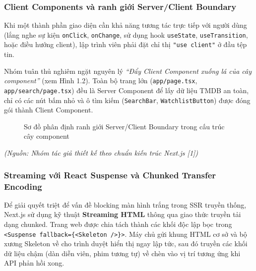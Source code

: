 \documentclass[13pt,a4paper]{extarticle}
\begin{document}
\subsubsection{Client Components và ranh giới Server/Client Boundary}
Khi một thành phần giao diện cần khả năng tương tác trực tiếp với người dùng (lắng nghe sự kiện \texttt{onClick}, \texttt{onChange}, sử dụng hook \texttt{useState}, \texttt{useTransition}, hoặc điều hướng client), lập trình viên phải đặt chỉ thị \texttt{"use client"} ở đầu tệp tin.

Nhóm tuân thủ nghiêm ngặt nguyên lý \textit{``Đẩy Client Component xuống lá của cây component''} (xem Hình 1.2). Toàn bộ trang lớn (\texttt{app/page.tsx}, \texttt{app/search/page.tsx}) đều là Server Component để lấy dữ liệu TMDB an toàn, chỉ có các nút bấm nhỏ và ô tìm kiếm (\texttt{SearchBar}, \texttt{WatchlistButton}) được đóng gói thành Client Component.

\begin{figure}[H]
\centering
{}
\caption{Sơ đồ phân định ranh giới Server/Client Boundary trong cấu trúc cây component}
\label{fig:boundary}
\end{figure}
\begin{flushleft}\small\textit{(Nguồn: Nhóm tác giả thiết kế theo chuẩn kiến trúc Next.js [1])}\end{flushleft}

\subsubsection{Streaming với React Suspense và Chunked Transfer Encoding}
Để giải quyết triệt để vấn đề blocking màn hình trắng trong SSR truyền thống, Next.js sử dụng kỹ thuật \textbf{Streaming HTML} thông qua giao thức truyền tải dạng chunked. Trang web được chia tách thành các khối độc lập bọc trong \texttt{<Suspense fallback=\{<Skeleton />\}>}. Máy chủ gửi khung HTML cơ sở và bộ xương Skeleton về cho trình duyệt hiển thị ngay lập tức, sau đó truyền các khối dữ liệu chậm (dàn diễn viên, phim tương tự) về chèn vào vị trí tương ứng khi API phản hồi xong.
\end{document}
